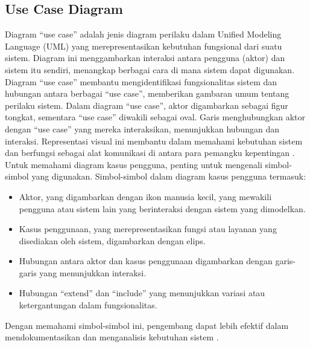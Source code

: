 \subsection{Use Case Diagram}
Diagram ``use case'' adalah jenis diagram perilaku dalam Unified Modeling Language (UML) yang merepresentasikan kebutuhan fungsional dari suatu sistem. Diagram ini menggambarkan interaksi antara pengguna (aktor) dan sistem itu sendiri, menangkap berbagai cara di mana sistem dapat digunakan. Diagram ``use case'' membantu mengidentifikasi fungsionalitas sistem dan hubungan antara berbagai ``use case'', memberikan gambaran umum tentang perilaku sistem.
\singlespacing{}
Dalam diagram ``use case'', aktor digambarkan sebagai figur tongkat, sementara ``use case'' diwakili sebagai oval. Garis menghubungkan aktor dengan ``use case'' yang mereka interaksikan, menunjukkan hubungan dan interaksi. Representasi visual ini membantu dalam memahami kebutuhan sistem dan berfungsi sebagai alat komunikasi di antara para pemangku kepentingan \citep{huzar2005uml}.
\singlespacing{}
Untuk memahami diagram kasus pengguna, penting untuk mengenali simbol-simbol yang digunakan. Simbol-simbol dalam diagram kasus pengguna termasuk:
\begin{itemize}
  \item Aktor, yang digambarkan dengan ikon manusia kecil, yang mewakili pengguna atau sistem lain yang berinteraksi dengan sistem yang dimodelkan.
  \item Kasus penggunaan, yang merepresentasikan fungsi atau layanan yang disediakan oleh sistem, digambarkan dengan elips.
  \item Hubungan antara aktor dan kasus penggunaan digambarkan dengan garis-garis yang menunjukkan interaksi.
  \item Hubungan ``extend'' dan ``include'' yang menunjukkan variasi atau ketergantungan dalam fungsionalitas.
\end{itemize}
Dengan memahami simbol-simbol ini, pengembang dapat lebih efektif dalam mendokumentasikan dan menganalisis kebutuhan sistem \citep{huzar2005uml}.

